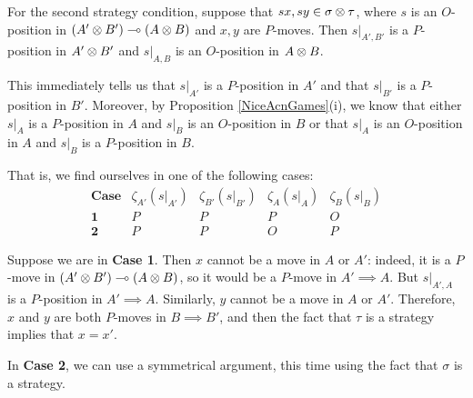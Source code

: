 \documentclass[11pt]{article} %
\begin{document}
For the second strategy condition, suppose that $sx, sy\in\sigma\otimes \tau$, where $s$ is an $O$-position in $(A'\otimes B')\multimap(A\otimes B)$ and $x,y$ are $P$-moves.  Then $s\vert_{A',B'}$ is a $P$-position in $A'\otimes B'$ and $s\vert_{A,B}$ is an $O$-position in $A\otimes B$.  

This immediately tells us that $s\vert_{A'}$ is a $P$-position in $A'$ and that $s\vert_{B'}$ is a $P$-position in $B'$.  Moreover, by Proposition \ref{NiceAcnGames}(i), we know that either $s\vert_{A}$ is a $P$-position in $A$ and $s\vert_{B}$ is an $O$-position in $B$ or that $s\vert_A$ is an $O$-position in $A$ and $s\vert_B$ is a $P$-position in $B$.  

That is, we find ourselves in one of the following cases:
\[
  \begin{array}{c|cccc}
    \textbf{Case} & \zeta_{A'}(s\vert_{A'}) & \zeta_{B'}(s\vert_{B'}) & \zeta_A(s\vert_A) & \zeta_B(s\vert_B) \\
    \hline
    \textbf{1} & P & P & P & O\\
    \textbf{2} & P & P & O & P
  \end{array}
  \]

Suppose we are in \textbf{Case 1}.  Then $x$ cannot be a move in $A$ or $A'$: indeed, it is a $P$-move in $(A'\otimes B')\multimap (A\otimes B)$, so it would be a $P$-move in $A'\implies A$.  But $s\vert_{A',A}$ is a $P$-position in $A'\implies A$.  Similarly, $y$ cannot be a move in $A$ or $A'$.  Therefore, $x$ and $y$ are both $P$-moves in $B\implies B'$, and then the fact that $\tau$ is a strategy implies that $x=x'$.  

In \textbf{Case 2}, we can use a symmetrical argument, this time using the fact that $\sigma$ is a strategy.  
\end{document}
